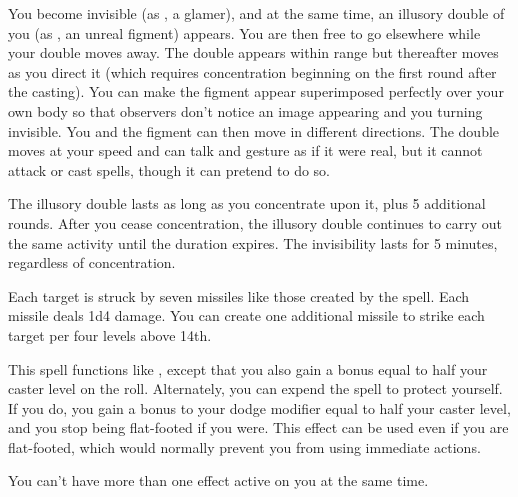 \begin{spelleffect}
  You become invisible (as , a glamer), and at the same time, an illusory double of you (as , an unreal figment) appears. You are then free to go elsewhere while your double moves away. The double appears within range but thereafter moves as you direct it (which requires concentration beginning on the first round after the casting). You can make the figment appear superimposed perfectly over your own body so that observers don't notice an image appearing and you turning invisible. You and the figment can then move in different directions. The double moves at your speed and can talk and gesture as if it were real, but it cannot attack or cast spells, though it can pretend to do so.
  \par The illusory double lasts as long as you concentrate upon it, plus 5 additional rounds. After you cease concentration, the illusory double continues to carry out the same activity until the duration expires. The invisibility lasts for 5 minutes, regardless of concentration.
\end{spelleffect}

\begin{spelleffect}
  Each target is struck by seven missiles like those created by the  spell. Each missile deals 1d4 damage. You can create one additional missile to strike each target per four levels above 14th.
\end{spelleffect}

\begin{spelleffect}
  This spell functions like , except that you also gain a bonus equal to half your caster level on the roll. Alternately, you can expend the spell to protect yourself. If you do, you gain a bonus to your dodge modifier equal to half your caster level, and you stop being flat-footed if you were. This effect can be used even if you are flat-footed, which would normally prevent you from using immediate actions.
\end{spelleffect}
\begin{spellnotes}
  You can't have more than one  effect active on you at the same time.
\end{spellnotes}

